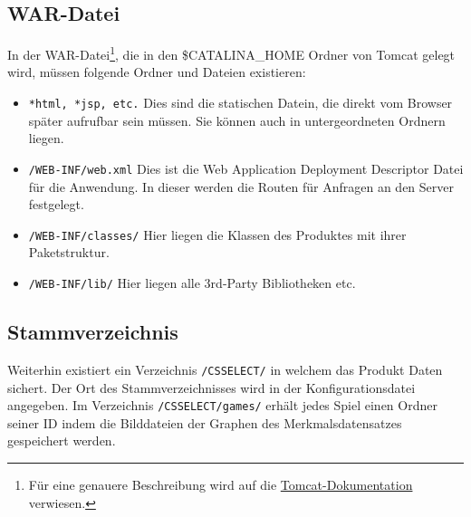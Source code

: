 \documentclass[a4paper]{scrreprt}
\begin{document}
    \subsection{WAR-Datei}
	In der WAR-Datei\footnote{Für eine genauere Beschreibung wird auf die \href{https://tomcat.apache.org/tomcat-7.0-doc/appdev/deployment.html\#Standard\_Directory\_Layout}{Tomcat-Dokumentation} verwiesen.}, die in den \$CATALINA\_HOME Ordner von Tomcat gelegt wird, müssen folgende Ordner und Dateien existieren:
    \begin{itemize}
        \item \texttt{*html, *jsp, etc.} Dies sind die statischen Datein, die direkt vom Browser später aufrufbar sein müssen. Sie können auch in untergeordneten Ordnern liegen.
        \item \texttt{/WEB-INF/web.xml} Dies ist die Web Application Deployment Descriptor Datei für die Anwendung. In dieser werden die Routen für Anfragen an den Server festgelegt.
        \item \texttt{/WEB-INF/classes/} Hier liegen die Klassen des Produktes mit ihrer Paketstruktur.
        \item \texttt{/WEB-INF/lib/} Hier liegen alle 3rd-Party Bibliotheken etc. 
    \end{itemize}
	\subsection{Stammverzeichnis}
	Weiterhin existiert ein Verzeichnis \texttt{/CSSELECT/} in welchem das Produkt Daten sichert.
	Der Ort des Stammverzeichnisses wird in der Konfigurationsdatei angegeben.
	Im Verzeichnis \texttt{/CSSELECT/games/} erhält jedes Spiel einen Ordner seiner ID indem die Bilddateien der Graphen des Merkmalsdatensatzes gespeichert werden.
	
\end{document}
